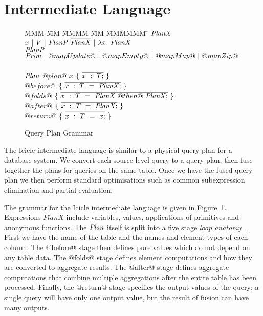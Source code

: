 \section{Intermediate Language}
\label{icicle:s:IcicleCore}

\begin{figure}

\begin{tabbing}
MMM \= MM \= MMMM \= MM \= MMMMMM \= \kill
$\mathit{PlanX}$
\GrammarDefTab
  $x~|~V~|~\mathit{PlanP}~\overline{\mathit{PlanX}}~|~\lambda{}x.~\mathit{PlanX}$
\\
$\mathit{PlanP}$
\GrammarDefTab
  $\mathit{Prim}~|~@mapUpdate@~|~@mapEmpty@~|~@mapMap@~|~@mapZip@$
\\
\\
$\mathit{Plan}$
\GrammarDefTab
  $@plan@~x$ \> $\{~\overline{x~:~T;}~\}$
\\
  \> \> $@before@$ \> $\{~\overline{x~:~T~=~\mathit{PlanX};}~\}$ \\
  \> \> $@folds@$  \> $\{~\overline{x~:~T~=~\mathit{PlanX}~@then@~\mathit{PlanX};}~\}$ \\
  \> \> $@after@$  \> $\{~\overline{x~:~T~=~\mathit{PlanX};}~\}$ \\
  \> \> $@return@$ \> $\{~\overline{x~:~T~=~x;}~\}$ \\
\end{tabbing}



\caption{Query Plan Grammar}
\label{icicle:fig:core:grammar}
\end{figure}

The Icicle intermediate language is similar to a physical query plan for a database system. We convert each source level query to a query plan, then fuse together the plans for queries on the same table. Once we have the fused query plan we then perform standard optimisations such as common subexpression elimination and partial evaluation.

The grammar for the Icicle intermediate language is given in Figure~\ref{icicle:fig:core:grammar}.
Expressions $PlanX$ include variables, values, applications of primitives and anonymous functions.
The $\mathit{Plan}$ itself is split into a five stage \emph{loop anatomy}~\cite{shivers2005anatomy}. First we have the name of the table and the names and element types of each column. The @before@ stage then defines pure values which do not depend on any table data. The @folds@ stage defines element computations and how they are converted to aggregate results. The @after@ stage defines aggregate computations that combine multiple aggregations after the entire table has been processed. Finally, the @return@ stage specifies the output values of the query; a single query will have only one output value, but the result of fusion can have many outputs.

